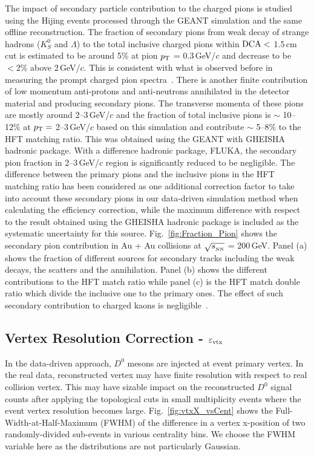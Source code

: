 \documentclass[%
 reprint,	
 amsmath,amssymb,
 aps,
 prc,
]{revtex4-1}
\begin{document}
The impact of secondary particle contribution to the charged pions is studied using the Hijing events processed through the GEANT simulation and the same offline reconstruction. The fraction of secondary pions from weak decay of strange hadrons ($K^0_S$ and $\Lambda$) to the total inclusive charged pions within ${\rm DCA}<$ 1.5\,cm cut is estimated to be around 5\% at pion $p_{\rm T}$ = 0.3\,GeV/$c$ and decrease to be $<2\%$ above 2\,GeV/$c$. This is consistent with what is observed before in measuring the prompt charged pion spectra~\cite{Adams:2003xp}. There is another finite contribution of low momentum anti-protons and anti-neutrons annihilated in the detector material and producing secondary pions. The transverse momenta of these pions are mostly around 2--3\,GeV/$c$ and the fraction of total inclusive pions is $\sim$ 10--12\% at $p_{\rm T}=$ 2--3\,GeV/$c$ based on this simulation and contribute $\sim$ 5--8\% to the HFT matching ratio. This was obtained using the GEANT with GHEISHA hadronic package. With a difference hadronic package, FLUKA, the secondary pion fraction in 2--3\,GeV/$c$ region is significantly reduced to be negligible. The difference between the primary pions and the inclusive pions in the HFT matching ratio has been considered as one additional correction factor to take into account these secondary pions in our data-driven simulation method when calculating the efficiency correction, while the maximum difference with respect to the result obtained using the GHEISHA hadronic package is included as the systematic uncertainty for this source.  Fig.~\ref{fig:Fraction_Pion} shows the secondary pion contribution in Au + Au collisions at $\sqrt{s_{_{\rm NN}}}$ = 200\,GeV. Panel (a) shows the fraction of different sources for secondary tracks including the weak decays, the scatters and the annihilation. Panel (b) shows the different contributions to the HFT match ratio while panel (c) is the HFT match double ratio which divide the inclusive one to the primary ones. The effect of such secondary contribution to charged kaons is negligible~\cite{Adams:2003xp}.

\subsection{\label{sec:correction:vtx}Vertex Resolution Correction - $\varepsilon_{\rm vtx}$}

In the data-driven approach, $D^0$ mesons are injected at event primary vertex. In the real data, reconstructed vertex may have finite resolution with respect to real collision vertex. This may have sizable impact on the reconstructed $D^0$ signal counts after applying the topological cuts in small multiplicity events where the event vertex resolution becomes large. Fig.~\ref{fig:vtxX_vsCent} shows the Full-Width-at-Half-Maximum (FWHM) of the difference in a vertex x-position of two randomly-divided sub-events in various centrality bins. We choose the FWHM variable here as the distributions are not particularly Gaussian.
\end{document}
